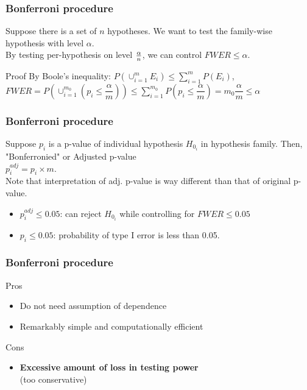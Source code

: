 \documentclass{beamer}
\begin{document}
\frame
{
  \frametitle{Bonferroni procedure}
    Suppose there is a set of $n$ hypotheses. We want to test the family-wise hypothesis with level $\alpha$.\vspace{0.07in}\\
    By testing per-hypothesis on level $\alpha \over n$, we can control $FWER \leq \alpha$.\vspace{0.22in}\\
    \begin{block}{Proof}
      By Boole's inequality: $P(\cup_{i=1}^{m}E_i)\leq\sum_{i=1}^m P(E_i)$\vspace{0.07in},\\
      \center $FWER=P(\cup_{i=1}^{m_0}(p_i\leq\dfrac{\alpha}{m}))\leq\sum_{i=1}^{m_0}P(p_i\leq\dfrac{\alpha}{m})=m_0\dfrac{\alpha}m\leq\alpha$
    \end{block}
}

\frame
{
  \frametitle{Bonferroni procedure}
    Suppose $p_i$ is a p-value of individual hypothesis $H_{0_i}$ in hypothesis family. Then, "Bonferronied" or Adjusted p-value\\ \center $p_i^{adj} = p_i \times m$.\vspace{0.1in}\\
    \flushleft Note that interpretation of adj. p-value is way different than that of original p-value.
    \begin{itemize}
      \item $p_i^{adj} \leq 0.05$: can reject $H_{0_i}$ while controlling for $FWER \leq 0.05$
      \item $p_i \leq 0.05$: probability of type I error is less than 0.05.\vspace{0.22in}\\
    \end{itemize}
}

\frame
{
    \frametitle{Bonferroni procedure}
    Pros
    \begin{itemize}
      \item Do not need assumption of dependence
      \item Remarkably simple and computationally efficient\vspace{0.1in}\\
    \end{itemize}
    
    Cons
    \begin{itemize}
      \item \textbf{Excessive amount of loss in testing power}\\ (too conservative)
    \end{itemize}
}
\end{document}
